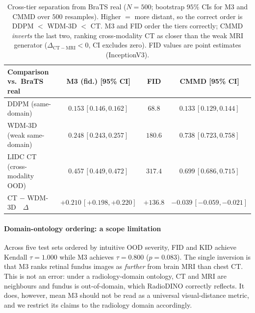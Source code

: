 \documentclass[lettersize,journal]{IEEEtran}
\begin{document}
\begin{table}[t]
\centering
\caption{%
  Cross-tier separation from BraTS real ($N = 500$; bootstrap $95\%$ CIs for
  M3 and CMMD over $500$ resamples). Higher $=$ more distant, so the correct
  order is DDPM $<$ WDM-3D $<$ CT. M3 and FID order the tiers correctly; CMMD
  \emph{inverts} the last two, ranking cross-modality CT as closer than the
  weak MRI generator ($\Delta_{\mathrm{CT}-\mathrm{MRI}} < 0$, CI excludes
  zero). FID values are point estimates (InceptionV3).
}
\label{tab:cmmd_fail}
\setlength{\tabcolsep}{3pt}
\small
{%
\begin{tabular}{lccc}
\toprule
Comparison vs.\ BraTS real & M3 (fid.) [95\% CI] & FID & CMMD [95\% CI] \\
\midrule
DDPM (same-domain)           & $0.153\,[0.146,0.162]$ & $68.8$  & $0.133\,[0.129,0.144]$ \\
WDM-3D (weak same-domain)    & $0.248\,[0.243,0.257]$ & $180.6$ & $0.738\,[0.723,0.758]$ \\
LIDC CT (cross-modality OOD) & $\mathbf{0.457}\,[0.449,0.472]$ & $317.4$ & $0.699\,[0.686,0.715]$ \\
\midrule
CT $-$ WDM-3D\ \ $\Delta$    & $\mathbf{+0.210}\,[+0.198,+0.220]$ & $+136.8$ & $-0.039\,[-0.059,-0.021]$ \\
\bottomrule
\end{tabular}}
\end{table}

\paragraph{Domain-ontology ordering: a scope limitation}
Across five test sets ordered by intuitive OOD severity, FID and KID
achieve Kendall $\tau = 1.000$ while M3 achieves $\tau = 0.800$
($p = 0.083$). The single inversion is that M3 ranks retinal fundus images
as \emph{further} from brain MRI than chest CT. This is not an error: under
a radiology-domain ontology, CT and MRI are neighbours and fundus is
out-of-domain, which RadioDINO correctly reflects. It does, however, mean
M3 should not be read as a universal visual-distance metric, and we restrict
its claims to the radiology domain accordingly.
\end{document}
